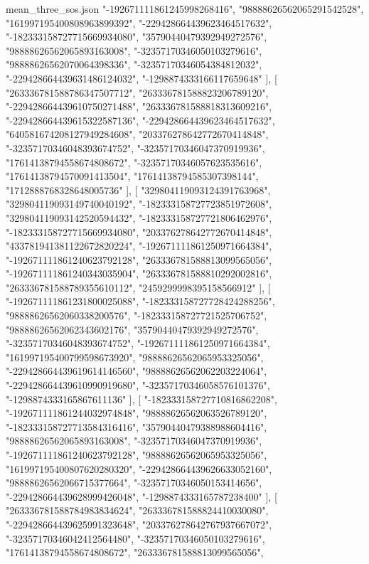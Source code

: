 \begin{filecontents*}[overwrite]{mean_three_sos.json}
    "-192671111861245998268416",
    "98888626562065291542528",
    "161997195400808963899392",
    "-229428664439623464517632",
    "-182333158727715669934080",
    "35790440479392949272576",
    "98888626562065893163008",
    "-32357170346050103279616",
    "98888626562070064398336",
    "-32357170346054384812032",
    "-229428664439631486124032",
    "-1298874333166117659648"
   ],
   [
    "263336781588786347507712",
    "263336781588823206789120",
    "-229428664439610750271488",
    "263336781588818313609216",
    "-229428664439615322587136",
    "-229428664439623464517632",
    "640581674208127949284608",
    "203376278642772670414848",
    "-32357170346048393674752",
    "-32357170346047370919936",
    "17614138794558674808672",
    "-32357170346057623535616",
    "17614138794570091413504",
    "17614138794585307398144",
    "1712888768328648005736"
   ],
   [
    "329804119093124391763968",
    "329804119093149740040192",
    "-182333158727723851972608",
    "329804119093142520594432",
    "-182333158727721806462976",
    "-182333158727715669934080",
    "203376278642772670414848",
    "433781941381122672820224",
    "-192671111861250971664384",
    "-192671111861240623792128",
    "263336781588813099565056",
    "-192671111861240343035904",
    "263336781588810292002816",
    "263336781588789355610112",
    "2459299998395158566912"
   ],
   [
    "-192671111861231800025088",
    "-182333158727728424288256",
    "98888626562060338200576",
    "-182333158727721525706752",
    "98888626562062343602176",
    "35790440479392949272576",
    "-32357170346048393674752",
    "-192671111861250971664384",
    "161997195400799598673920",
    "98888626562065953325056",
    "-229428664439619614146560",
    "98888626562062203224064",
    "-229428664439610990919680",
    "-32357170346058576101376",
    "-1298874333165867611136"
   ],
   [
    "-182333158727710816862208",
    "-192671111861244032974848",
    "98888626562063526789120",
    "-182333158727713584316416",
    "35790440479388988604416",
    "98888626562065893163008",
    "-32357170346047370919936",
    "-192671111861240623792128",
    "98888626562065953325056",
    "161997195400807620280320",
    "-229428664439626633052160",
    "98888626562066715377664",
    "-32357170346050153414656",
    "-229428664439628999426048",
    "-1298874333165787238400"
   ],
   [
    "263336781588784983834624",
    "263336781588824410030080",
    "-229428664439625991323648",
    "203376278642767937667072",
    "-32357170346042412564480",
    "-32357170346050103279616",
    "17614138794558674808672",
    "263336781588813099565056",

\end{filecontents*}
